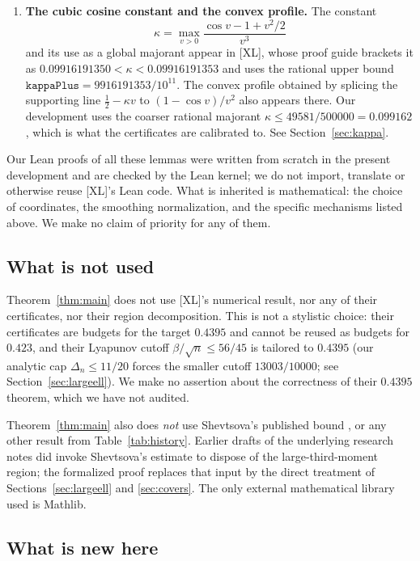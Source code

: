 \documentclass[11pt,a4paper]{article}
\theoremstyle{definition}
\newcommand{\kap}{\kappa}
\newcommand{\Lean}[1]{\texttt{#1}}
\begin{document}
\begin{enumerate}[label=(\roman*),leftmargin=2.4em]
\item \textbf{The cubic cosine constant and the convex profile.} The constant
  \[
    \kap=\max_{v>0}\frac{\cos v-1+v^2/2}{v^3}
  \]
  and its use as a global majorant appear in [XL], whose proof guide brackets it
  as $0.09916191350<\kap<0.09916191353$ and uses the rational upper bound
  $\Lean{kappaPlus}=9916191353/10^{11}$. The convex profile obtained by splicing
  the supporting line $\tfrac12-\kap v$ to $(1-\cos v)/v^2$ also appears
  there. Our development uses the coarser rational majorant
  $\kap\le 49581/500000=0.099162$, which is what the certificates are calibrated
  to. See Section~\ref{sec:kappa}.
\end{enumerate}

Our Lean proofs of all these lemmas were written from scratch in the present
development and are checked by the Lean kernel; we do not import, translate or
otherwise reuse [XL]'s Lean code. What is inherited is mathematical: the choice
of coordinates, the smoothing normalization, and the specific mechanisms listed
above. We make no claim of priority for any of them.

\subsection{What is not used}

Theorem~\ref{thm:main} does not use [XL]'s numerical result, nor any of their
certificates, nor their region decomposition. This is not a stylistic choice:
their certificates are budgets for the target $0.4395$ and cannot be reused as
budgets for $0.423$, and their Lyapunov cutoff $\beta/\sqrt n\le 56/45$ is
tailored to $0.4395$ (our analytic cap $\Delta_n\le 11/20$ forces the smaller
cutoff $13003/10000$; see Section~\ref{sec:largeell}). We make no assertion about
the correctness of their $0.4395$ theorem, which we have not audited.

Theorem~\ref{thm:main} also does \emph{not} use Shevtsova's published bound
\cite{Shevtsova2011,Shevtsova2013}, or any other result from
Table~\ref{tab:history}. Earlier drafts of the underlying research notes did
invoke Shevtsova's estimate to dispose of the large-third-moment region; the
formalized proof replaces that input by the direct treatment of
Sections~\ref{sec:largeell} and \ref{sec:covers}. The only external mathematical
library used is Mathlib.

\subsection{What is new here}
\end{document}
